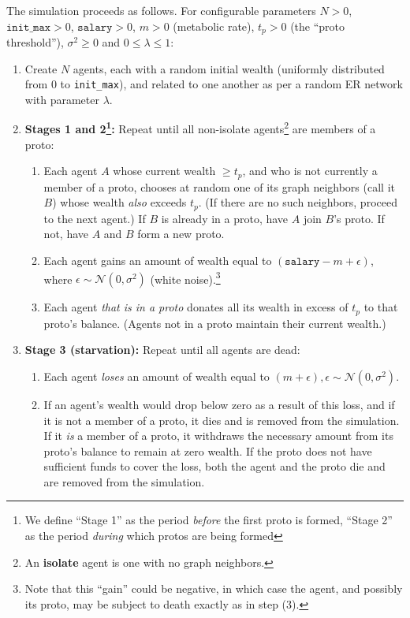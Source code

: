 \documentclass[sigconf]{acmart}
\begin{document}
The simulation proceeds as follows. For configurable parameters
$N > 0$,
$\texttt{init\_max} > 0$,
$\texttt{salary} > 0$,
$m > 0$ (metabolic rate),
$t_p > 0$ (the ``proto threshold''),
$\sigma^2 \ge 0$ and
$0 \le \lambda \le 1$:

\begin{enumerate}
\itemsep.1em
\item Create $N$ agents, each with a random initial wealth (uniformly distributed from 0 to \texttt{init\_max}), and related to one another as per a random ER network with parameter $\lambda$.
\item \textbf{Stages 1 and 2\footnote{We define ``Stage 1'' as the period \textit{before} the first proto is formed, ``Stage 2'' as the period \textit{during} which protos are being formed}:} Repeat until all non-isolate agents\footnote{An \textbf{isolate} agent is one with no graph neighbors.} are members of a proto:
    \begin{enumerate}
    \itemsep.1em
    \item Each agent $A$ whose current wealth $\ge t_p$, and who is not currently a member of a proto, chooses at random one of its graph neighbors (call it $B$) whose wealth \textit{also} exceeds $t_p$. (If there are no such neighbors, proceed to the next agent.) If $B$ is already in a proto, have $A$ join $B$'s proto. If not, have $A$ and $B$ form a new proto.
    \item Each agent gains an amount of wealth equal to $(\texttt{salary} - m + \epsilon)$, where $\epsilon \sim \mathcal{N}(0,\sigma^2)$ (white noise).\footnote{Note that this ``gain'' could be negative, in which case the agent, and possibly its proto, may be subject to death exactly as in step (3).}
    \item Each agent \textit{that is in a proto} donates all its wealth in excess of $t_p$ to that proto's balance. (Agents not in a proto maintain their current wealth.)
    \end{enumerate}
    \item \textbf{Stage 3 (starvation):} Repeat until all agents are dead:
        \begin{enumerate}
        \itemsep.1em
        \item Each agent \textit{loses} an amount of wealth equal to $(m + \epsilon), \epsilon \sim \mathcal{N}(0,\sigma^2)$.
        \item If an agent's wealth would drop below zero as a result of this loss, and if it is not a member of a proto, it dies and is removed from the simulation. If it \textit{is} a member of a proto, it withdraws the necessary amount from its proto's balance to remain at zero wealth. If the proto does not have sufficient funds to cover the loss, both the agent and the proto die and are removed from the simulation.
        \end{enumerate}
\end{enumerate}
\end{document}
